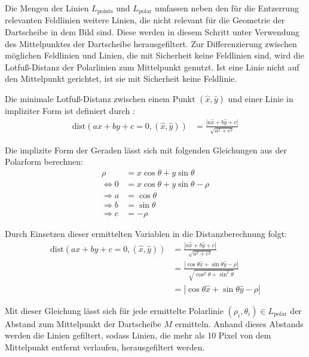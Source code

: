 Die Mengen der Linien $L_\text{points}$ und $L_\text{polar}$ umfassen neben den für die Entzerrung relevanten Feldlinien weitere Linien, die nicht relevant für die Geometrie der Dartscheibe in dem Bild sind. Diese werden in diesem Schritt unter Verwendung des Mittelpunktes der Dartscheibe herausgefiltert. Zur Differenzierung zwischen möglichen Feldlinien und Linien, die mit Sicherheit keine Feldlinien sind, wird die Lotfuß-Distanz der Polarlinien zum Mittelpunkt genutzt. Ist eine Linie nicht auf den Mittelpunkt gerichtet, ist sie mit Sicherheit keine Feldlinie.

Die minimale Lotfuß-Distanz zwischen einem Punkt $(\hat{x}, \hat{y})$ und einer Linie in impliziter Form ist definiert durch \cite{point_line_distance}:
\begin{align*}
    \text{dist}(ax + by + c = 0, (\hat{x}, \hat{y})) & = \frac{| a \hat{x} + b \hat{y} + c|}{\sqrt{a^2+c^2}}
\end{align*}

Die implizite Form der Geraden lässt sich mit folgenden Gleichungen aus der Polarform berechnen:
\begin{align*}
    \rho          & = x \cos{\theta} + y \sin{\theta}        \\
    \iff 0        & = x \cos{\theta} + y \sin{\theta} - \rho \\
    \Rightarrow a & = \cos{\theta}                           \\
    \Rightarrow b & = \sin{\theta}                           \\
    \Rightarrow c & = -\rho
\end{align*}

Durch Einsetzen dieser ermittelten Variablen in die Distanzberechnung folgt:
\begin{align*}
    \text{dist}(ax + by + c = 0, (\hat{x}, \hat{y})) & = \frac{| a \hat{x} + b \hat{y} + c|}{\sqrt{a^2+c^2}}                                                   \\
                                                     & = \frac{| \cos{\theta} \hat{x} + \sin{\theta} \hat{y} - \rho |}{\sqrt{\cos^2{\theta} + \sin^2{\theta}}} \\
                                                     & = | \cos{\theta} \hat{x} + \sin{\theta} \hat{y} - \rho |
\end{align*}

Mit dieser Gleichung lässt sich für jede ermittelte Polarlinie $(\rho_i, \theta_i) \in L_\text{polar}$ der Abstand zum Mittelpunkt der Dartscheibe $M$ ermitteln. Anhand dieses Abstands werden die Linien gefiltert, sodass Linien, die mehr als 10 Pixel von dem Mittelpunkt entfernt verlaufen, herausgefiltert werden.

